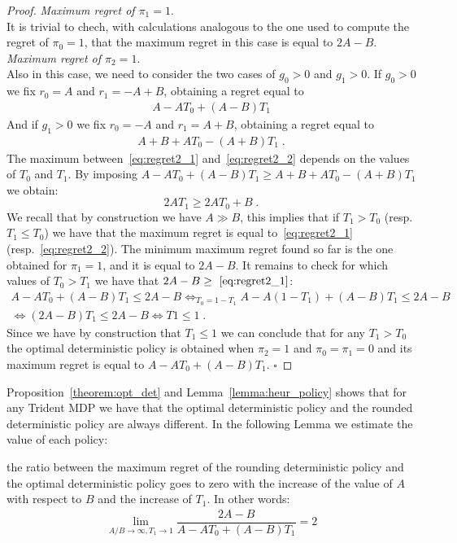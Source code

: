 \begin{proof}
\textit{Maximum regret of $\pi_1=1$}.\\
It is trivial to chech, with calculations analogous to the one used to compute the regret of $\pi_0=1$, that the maximum regret in this case is equal to $2A-B$.\\




\textit{Maximum regret of $\pi_2=1$}.\\
Also in this case, we need to consider the two cases of $g_0 > 0$ and $g_1 > 0$. If $g_0 > 0$ we fix $r_0 = A$ and $r_1 = -A+B$, obtaining a regret equal to 
\begin{align}
A- A T_0 +(A-B) T_1 \label{eq:regret2_1}
\end{align}
And if $g_1 > 0$ we fix $r_0 = -A$ and $r_1 = A+B$, obtaining a regret equal to 
\begin{align}
A+B+A T_0 -(A+B) T_1\;. \label{eq:regret2_2}
\end{align}
The maximum between~\eqref{eq:regret2_1} and~\eqref{eq:regret2_2} depends on the values of $T_0$ and $T_1$.
By imposing  $A- A T_0 +(A-B) T_1 \geq A+B+A T_0 -(A+B) T_1$ we obtain:
$$ 2A T_1 \geq 2 A T_0 + B\;. $$
We recall that by construction we have $A \gg B$, this implies that if $T_1> T_0$ (resp. $T_1\leq T_0$)  we have that the maximum regret is equal to~\eqref{eq:regret2_1} (resp.~\eqref{eq:regret2_2}).
The minimum maximum regret found so far is the one obtained for $\pi_1=1$, and it is equal to $2A-B$. It remains to check for which values of $T_0 > T_1$ we have that $2A-B \geq~\eqref{eq:regret2_1}$:
\begin{align*}
A- A T_0 +(A-B) T_1 \leq 2A - B \Leftrightarrow_{T_0 = 1-T_1} A- A (1-T_1) +(A-B) T_1 \leq 2A - B\\
  \Leftrightarrow (2A-B)T_1 \leq 2A-B  \Leftrightarrow T1 \leq 1\;.
\end{align*}
 Since we have by construction that $T_1 \leq1$ we can conclude that for any $T_1> T_0$ the optimal deterministic policy is obtained when $\pi_{2}=1$ and $\pi_{0}=\pi_{1}=0$ and its maximum regret is equal to $A- A T_0 +(A-B) T_1$. $\square$
\end{proof}


Proposition~\ref{theorem:opt_det} and Lemma~\ref{lemma:heur_policy} shows that for any Trident MDP we have that the optimal deterministic policy and the rounded deterministic policy are always different. In the following Lemma we estimate the value of each policy:


\begin{lemma}
the ratio between the maximum regret of the rounding deterministic policy and the optimal deterministic policy goes to zero with the increase of the value of $A$ with respect to $B$ and the increase of $T_1$. In other words:  
\begin{align*}
\lim_{A/B \rightarrow \infty, T_1 \rightarrow 1} \dfrac{2A-B}{A- A T_0 +(A-B) T_1} = 2
\end{align*}
\end{lemma}